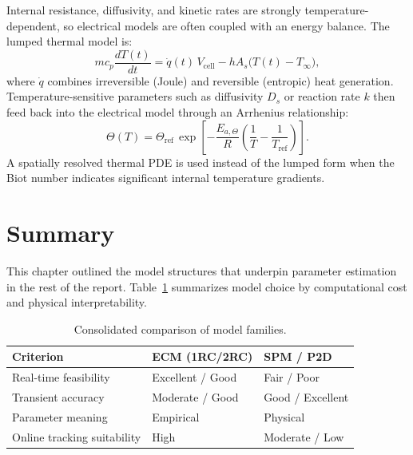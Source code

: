 Internal resistance, diffusivity, and kinetic rates are strongly temperature-dependent, so electrical models are often coupled with an energy balance. The lumped thermal model is:
\begin{equation}
    m c_p \frac{dT(t)}{dt} = \dot{q}(t)\, V_{\text{cell}} - h A_s \big(T(t) - T_\infty\big),
    \label{eq:lumped_thermal}
\end{equation}
where $\dot{q}$ combines irreversible (Joule) and reversible (entropic) heat generation. Temperature-sensitive parameters such as diffusivity $D_s$ or reaction rate $k$ then feed back into the electrical model through an Arrhenius relationship:
\begin{equation}
    \Theta(T) = \Theta_{\text{ref}}\, \exp\!\left[-\frac{E_{a,\Theta}}{R}\left(\frac{1}{T} - \frac{1}{T_{\text{ref}}}\right)\right].
    \label{eq:arrhenius}
\end{equation}
A spatially resolved thermal PDE is used instead of the lumped form when the Biot number indicates significant internal temperature gradients.

\section{Summary}
\label{sec:summary_ch2}

This chapter outlined the model structures that underpin parameter estimation in the rest of the report. Table~\ref{tab:chapter2_master_comparison} summarizes model choice by computational cost and physical interpretability.

\begin{table}[htbp]
\centering
\caption{Consolidated comparison of model families.}
\label{tab:chapter2_master_comparison}
\footnotesize
\begin{tabularx}{\textwidth}{
    >{\raggedright\arraybackslash}p{2.6cm}
    >{\raggedright\arraybackslash}X
    >{\raggedright\arraybackslash}X
}
\toprule
\textbf{Criterion} & \textbf{ECM (1RC/2RC)} & \textbf{SPM / P2D} \\
\midrule
Real-time feasibility & Excellent / Good & Fair / Poor \\
Transient accuracy & Moderate / Good & Good / Excellent \\
Parameter meaning & Empirical & Physical \\
Online tracking suitability & High & Moderate / Low \\
\bottomrule
\end{tabularx}
\end{table}